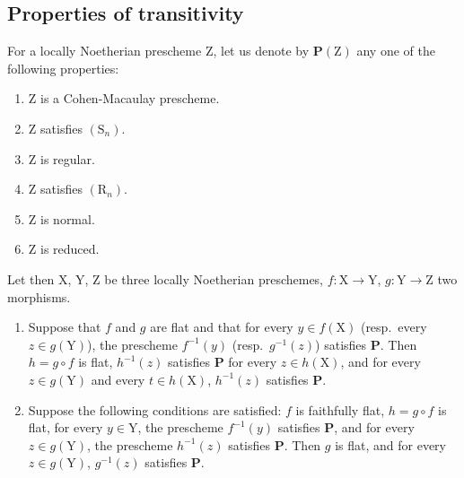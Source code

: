\subsection{Properties of transitivity}
\label{subsection:IV.6.6}

\begin{proposition}[6.6.1]
\label{IV.6.6.1}
For a locally Noetherian prescheme $\mathrm{Z}$, let us denote by $\boldsymbol{P}(\mathrm{Z})$ any one of the following properties:
\begin{enumerate}[label=\emph{\alph*)}]
  \item $\mathrm{Z}$ is a Cohen-Macaulay prescheme.
  \item $\mathrm{Z}$ satisfies $(\mathrm{S}_n)$.
  \item $\mathrm{Z}$ is regular.
  \item $\mathrm{Z}$ satisfies $(\mathrm{R}_n)$.
  \item $\mathrm{Z}$ is normal.
  \item $\mathrm{Z}$ is reduced.
\end{enumerate}
Let then $\mathrm{X}$, $\mathrm{Y}$, $\mathrm{Z}$ be three locally Noetherian preschemes, $f:\mathrm{X}\to\mathrm{Y}$, $g:\mathrm{Y}\to\mathrm{Z}$ two morphisms.
\begin{enumerate}[label=(\roman*)]
  \item Suppose that $f$ and $g$ are flat and that for every $y\in f(\mathrm{X})$ \textnormal{(}resp.\ every $z\in g(\mathrm{Y})$\textnormal{)}, the prescheme $f^{-1}(y)$ \textnormal{(}resp.\ $g^{-1}(z)$\textnormal{)} satisfies $\boldsymbol{P}$. Then $h=g\circ f$ is flat, $h^{-1}(z)$ satisfies $\boldsymbol{P}$ for every $z\in h(\mathrm{X})$, and for every $z\in g(\mathrm{Y})$ and every $t\in h(\mathrm{X})$, $h^{-1}(z)$ satisfies $\boldsymbol{P}$.

  \item Suppose the following conditions are satisfied: $f$ is faithfully flat, $h=g\circ f$ is flat, for every $y\in\mathrm{Y}$, the prescheme $f^{-1}(y)$ satisfies $\boldsymbol{P}$, and for every $z\in g(\mathrm{Y})$, the prescheme $h^{-1}(z)$ satisfies $\boldsymbol{P}$. Then $g$ is flat, and for every $z\in g(\mathrm{Y})$, $g^{-1}(z)$ satisfies $\boldsymbol{P}$.
\end{enumerate}
\end{proposition}

